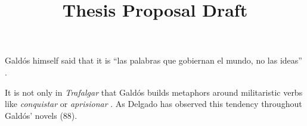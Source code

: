 \documentclass[12pt]{article}
\title{Thesis Proposal Draft}
\makeatletter
\newcommand\iraggedright{%
  \let\\\@centercr\@rightskip\@flushglue \rightskip\@rightskip
  \leftskip\z@skip}
\makeatother
\begin{document}
\makeheader
\iraggedright

Galdós himself said that it is \enquote{las palabras que gobiernan el mundo, no las ideas} \cite[87]{Delgado2000}.

It is not only in \textit{Trafalgar} that Galdós builds metaphors around militaristic verbs like \textit{conquistar} or \textit{aprisionar} \cite[88]{Delgado2000}.
As Delgado has observed this tendency throughout Galdós' novels (88).



\makeworkscited
\end{document}
